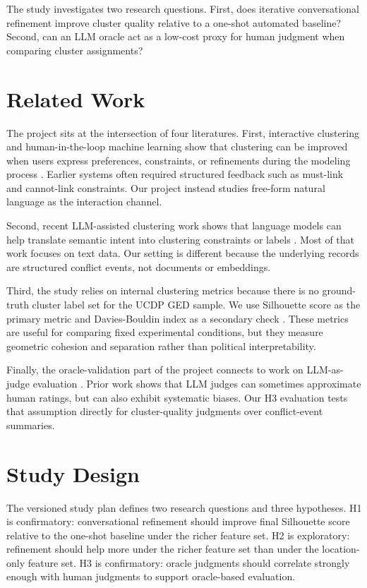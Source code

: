 \documentclass[11pt,a4paper]{article}
\begin{document}
The study investigates two research questions. First, does iterative conversational refinement improve cluster quality relative to a one-shot automated baseline? Second, can an LLM oracle act as a low-cost proxy for human judgment when comparing cluster assignments?

\section{Related Work}

The project sits at the intersection of four literatures. First, interactive clustering and human-in-the-loop machine learning show that clustering can be improved when users express preferences, constraints, or refinements during the modeling process \cite{cohn2017, choo2013, amershi2014}. Earlier systems often required structured feedback such as must-link and cannot-link constraints. Our project instead studies free-form natural language as the interaction channel.

Second, recent LLM-assisted clustering work shows that language models can help translate semantic intent into clustering constraints or labels \cite{zhang2023, viswanathan2023, grootendorst2022}. Most of that work focuses on text data. Our setting is different because the underlying records are structured conflict events, not documents or embeddings.

Third, the study relies on internal clustering metrics because there is no ground-truth cluster label set for the UCDP GED sample. We use Silhouette score as the primary metric and Davies-Bouldin index as a secondary check \cite{rousseeuw1987, davies1979, arbelaitz2013}. These metrics are useful for comparing fixed experimental conditions, but they measure geometric cohesion and separation rather than political interpretability.

Finally, the oracle-validation part of the project connects to work on LLM-as-judge evaluation \cite{zheng2023, chiang2023, guo2023}. Prior work shows that LLM judges can sometimes approximate human ratings, but can also exhibit systematic biases. Our H3 evaluation tests that assumption directly for cluster-quality judgments over conflict-event summaries.

\section{Study Design}

The versioned study plan defines two research questions and three hypotheses. H1 is confirmatory: conversational refinement should improve final Silhouette score relative to the one-shot baseline under the richer feature set. H2 is exploratory: refinement should help more under the richer feature set than under the location-only feature set. H3 is confirmatory: oracle judgments should correlate strongly enough with human judgments to support oracle-based evaluation.
\end{document}
